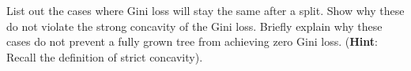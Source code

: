\item {} List out the cases where Gini loss will stay the same after a split.  Show why these do not violate the strong concavity of the Gini loss.  Briefly explain why these cases do not prevent a fully grown tree from achieving zero Gini loss. (\textbf{Hint}: Recall the definition of strict concavity).